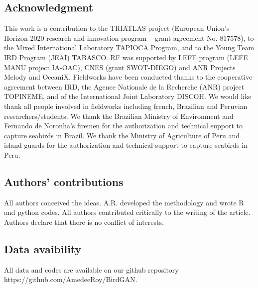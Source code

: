 \documentclass{article}
\begin{document}
\subsection*{Acknowledgment}
This work is a contribution to the TRIATLAS project (European Union's Horizon 2020 research and innovation program – grant agreement No. 817578), to the Mixed International Laboratory TAPIOCA Program, and to the Young Team IRD Program (JEAI) TABASCO. RF was supported by LEFE program (LEFE MANU project IA-OAC), CNES (grant SWOT-DIEGO) and ANR Projects Melody and OceaniX. Fieldworks have been conducted thanks to the cooperative agreement between IRD, the Agence Nationale de la Recherche (ANR) project TOPINEME, and of the International Joint Laboratory DISCOH. We would like thank all people involved in fieldworks including french, Brazilian and Peruvian researchers/students. We thank the Brazilian Ministry of Environment and Fernando de Noronha's firemen for the authorization and technical support to capture seabirds in Brazil. We thank the Ministry of Agriculture of Peru and island guards for the authorization and technical support to capture seabirds in Peru.

\subsection*{Authors' contributions}
All authors conceived the ideas. A.R. developed the methodology and wrote R and python codes. All authors contributed critically to the writing of the article. Authors declare that there is no conflict of interests.

\subsection*{Data avaibility}
All data and codes are available on our github repository https://github.com/AmedeeRoy/BirdGAN.

\newpage



\end{document}
